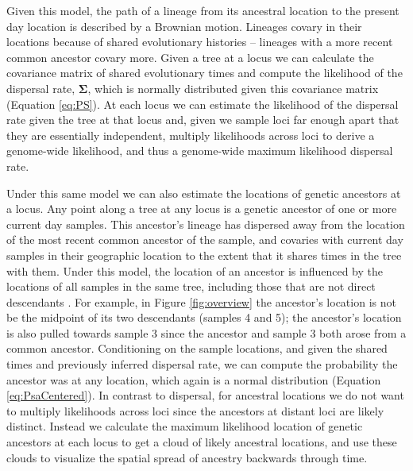 \documentclass[12pt]{article}
\begin{document}
Given this model, the path of a lineage from its ancestral location to the present day location is described by a Brownian motion. 
Lineages covary in their locations because of shared evolutionary histories -- lineages with a more recent common ancestor covary more.
Given a tree at a locus we can calculate the covariance matrix of shared evolutionary times and compute the likelihood of the dispersal rate, $\mathbf{\Sigma}$, which is normally distributed given this covariance matrix (Equation \eqref{eq:PS}).
At each locus we can estimate the likelihood of the dispersal rate given the tree at that locus and, given we sample loci far enough apart that they are essentially independent, multiply likelihoods across loci to derive a genome-wide likelihood, and thus a genome-wide maximum likelihood dispersal rate.

Under this same model we can also estimate the locations of genetic ancestors at a locus.
Any point along a tree at any locus is a genetic ancestor of one or more current day samples. 
This ancestor's lineage has dispersed away from the location of the most recent common ancestor of the sample, and covaries with current day samples in their geographic location to the extent that it shares times in the tree with them.
Under this model, the location of an ancestor is influenced by the locations of all samples in the same tree, including those that are not direct descendants \citep[cf.][]{wohns2021unified}.
For example, in Figure \ref{fig:overview} the ancestor's location is not be the midpoint of its two descendants (samples 4 and 5); the ancestor's location is also pulled towards sample 3 since the ancestor and sample 3 both arose from a common ancestor.
Conditioning on the sample locations, and given the shared times and previously inferred dispersal rate, we can compute the probability the ancestor was at any location, which again is a normal distribution (Equation \eqref{eq:PsaCentered}). 
In contrast to dispersal, for ancestral locations we do not want to multiply likelihoods across loci since the ancestors at distant loci are likely distinct.
Instead we calculate the maximum likelihood location of genetic ancestors at each locus to get a cloud of likely ancestral locations, and use these clouds to visualize the spatial spread of ancestry backwards through time.
\end{document}
